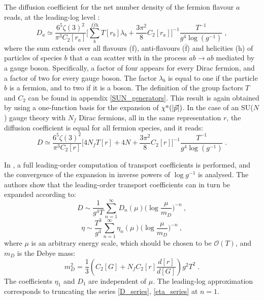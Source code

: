The diffusion coefficient for the net number density of the fermion flavour $a$ reads, at the leading-log level \cite{Arnold:2000dr}:
\begin{equation}
D_a \simeq \frac{6^5 \zeta(3)^2}{\pi^3 C_2[r_a]} \biggl[ \sum_b^{f \bar{f} h} T[r_b] \lambda_b + \frac{3 \pi^2}{8} 
C_2[r_a] \biggr]^{-1}  \frac{T^{-1}}{g^4 \log(g^{-1})}\;, 
\label{diff_coeff}
\end{equation}
%
where the sum extends over all flavours (f), anti-flavours ($\bar{\mathrm f}$) and helicities (h) of particles of species $b$ that $a$ can scatter with in the process $ab \to ab$ mediated by a gauge boson. Specifically, a factor of four appears for every Dirac fermion, and a factor of two for every gauge boson. The factor $\lambda_b$  is  equal to one if the particle $b$ is a fermion, and to two if it is a boson. The definition of the group factors $T$ and $C_2$ can be found in appendix \ref{SUN_generators}. This result is again obtained by using a one-function basis for the expansion of $\chi^a(\abs{\vec p})$. In the case of an SU($N$) gauge theory with $N_f$ Dirac fermions, all in the same representation $r$, the diffusion coefficient is equal for all fermion species, and it reads:
\begin{equation}
D \simeq \frac{6^5 \zeta(3)^2}{\pi^3 C_2[r]} \biggl[ 4 N_f T[r] + 4 N + \frac{3 \pi^2}{8} C_2[r] \biggr]^{-1} 
 \frac{T^{-1}}{g^4\log(g^{-1})} \;.
\end{equation}

In \cite{Arnold:2003zc}, a full leading-order computation of transport coefficients is performed, and the convergence of the expansion in inverse powers of $\log g^{-1}$ is analysed. The authors show that the leading-order transport coefficients can in turn be expanded according to:
\begin{equation}
D \sim \frac{1}{g^4 T} \sum_{n=1}^{\infty} D_n(\mu) \biggl( \log\frac{\mu}{m_D}\biggr)^{-n} \: ,
\label{D_series}
\end{equation}
\begin{equation}
\eta \sim \frac{T^3}{g^4} \sum_{n=1}^{\infty} \eta_n(\mu) \biggl( \log\frac{\mu}{m_D}\biggr)^{-n} \: ,
\label{eta_series}
\end{equation}
%
where $\mu$ is an arbitrary energy scale, which should be chosen to be $\mathcal O(T)$, and $m_D$ is the Debye mass:
 \begin{equation}
 m_D^2 =  \frac{1}{3} \left(C_2[G] + N_f C_2[r]\frac{d[r]}{d[G]}  \right)g^2 T^2 \; .
\label{Debye_mass} 
\end{equation}
%
The coefficients $\eta_1$ and $D_1$ are independent of $\mu$. The leading-log approximation corresponds to truncating the series \ref{D_series}, \ref{eta_series} at $n=1$.

